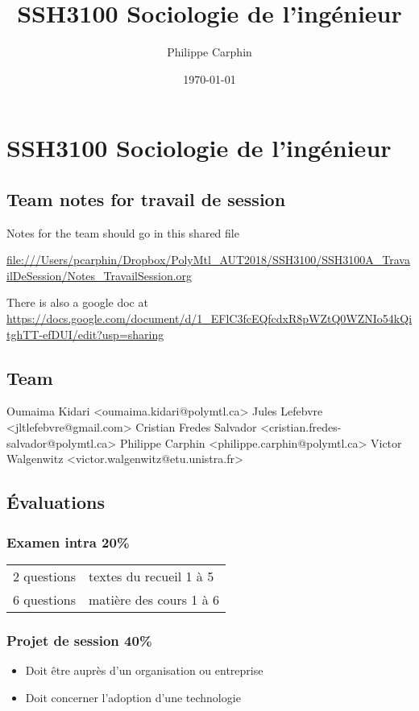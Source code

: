 \documentclass[11pt]{article}
\author{Philippe Carphin}
\date{\today}
\title{SSH3100 Sociologie de l'ingénieur}
\begin{document}
\maketitle
\tableofcontents


\section{SSH3100 Sociologie de l'ingénieur}
\label{sec:org6079eeb}
\subsection{Team notes for travail de session}
\label{sec:org08981be}

Notes for the team should go in this shared file

\url{file:///Users/pcarphin/Dropbox/PolyMtl\_AUT2018/SSH3100/SSH3100A\_TravailDeSession/Notes\_TravailSession.org}

There is also a google doc at \url{https://docs.google.com/document/d/1\_EFlC3fcEQfcdxR8pWZtQ0WZNIo54kQitghTT-efDUI/edit?usp=sharing}
\subsection{Team}
\label{sec:org8023013}
Oumaima Kidari <oumaima.kidari@polymtl.ca>
Jules Lefebvre <jltlefebvre@gmail.com>
Cristian Fredes Salvador <cristian.fredes-salvador@polymtl.ca>
Philippe Carphin <philippe.carphin@polymtl.ca>
Victor Walgenwitz <victor.walgenwitz@etu.unistra.fr>
\subsection{Évaluations}
\label{sec:orge7e90cb}
\subsubsection{Examen intra 20\%}
\label{sec:org9fd63b4}
\begin{center}
\begin{tabular}{ll}
2 questions & textes du recueil 1 à 5\\
6 questions & matière des cours 1 à 6\\
\end{tabular}
\end{center}
\subsubsection{Projet de session 40\%}
\label{sec:org772a0db}
\begin{itemize}
\item Doit être auprès d'un organisation ou entreprise
\item Doit concerner l'adoption d'une technologie
\end{itemize}
\end{document}
